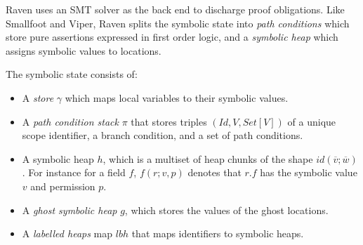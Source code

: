 \documentclass{article}
\begin{document}
Raven uses an SMT solver as the back end to discharge proof obligations. Like Smallfoot and Viper, Raven splits the symbolic state into \textit{path conditions} which store pure assertions expressed in first order logic, and a \textit{symbolic heap} which assigns symbolic values to locations.

The symbolic state consists of:
\begin{itemize}
	\item A \textit{store} $\gamma$ which maps local variables to their symbolic values.
	\item A \textit{path condition stack} $\pi$ that stores triples $(\textit{Id}, \textit{V}, \textit{Set}[V])$ of a unique scope identifier, a branch condition, and a set of path conditions.
	\item A symbolic heap $h$, which is a multiset of heap chunks of the shape $id(\overline{v};\overline{w})$. For instance for a field $f$, $f(r;v,p)$ denotes that $r.f$ has the symbolic value $v$ and permission $p$.
	\item A \textit{ghost symbolic heap} $g$, which stores the values of the ghost locations.
	\item A \textit{labelled heaps} map $lbh$ that maps identifiers to symbolic heaps.
\end{itemize}


\iffalse
- Grammar needs to be styled properly, specially wrt multi line declarations for procs/funcs/etc.
- How to represent optional parameters, for example the arguments for interfaces and modules.
- monospace font for the keywords
\fi
\end{document}
